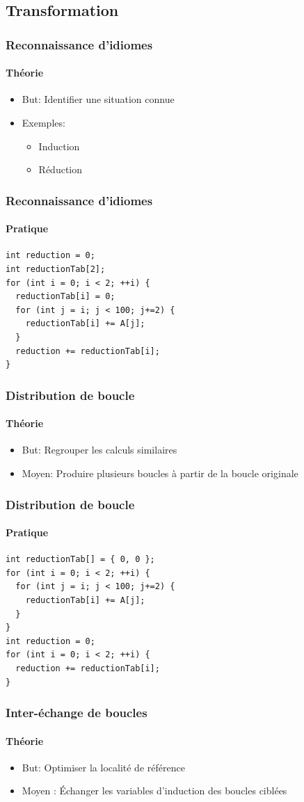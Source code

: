 \documentclass{beamer}
\begin{document}
\subsection{Transformation}
\begin{frame}
\frametitle{Reconnaissance d'idiomes}
\framesubtitle{Théorie}
\begin{itemize}
\item But: Identifier une situation connue
\item Exemples:
\begin{itemize}
\item Induction
\item Réduction
\end{itemize}
\end{itemize}
\end{frame}

\begin{frame}[fragile]
\frametitle{Reconnaissance d'idiomes}
\framesubtitle{Pratique}
\begin{lstlisting}
int reduction = 0;
int reductionTab[2];
for (int i = 0; i < 2; ++i) {
  reductionTab[i] = 0;
  for (int j = i; j < 100; j+=2) {
    reductionTab[i] += A[j];
  }
  reduction += reductionTab[i];
}
\end{lstlisting}
\end{frame}

\begin{frame}
\frametitle{Distribution de boucle}
\framesubtitle{Théorie}
\begin{itemize}
\item But: Regrouper les calculs similaires
\item Moyen: Produire plusieurs boucles à partir de la boucle originale
\end{itemize}
\end{frame}

\begin{frame}[fragile]
\frametitle{Distribution de boucle}
\framesubtitle{Pratique}
\begin{lstlisting}
int reductionTab[] = { 0, 0 };
for (int i = 0; i < 2; ++i) {
  for (int j = i; j < 100; j+=2) {
    reductionTab[i] += A[j];
  }
}
int reduction = 0;
for (int i = 0; i < 2; ++i) {
  reduction += reductionTab[i];
}
\end{lstlisting}
\end{frame}

\begin{frame}
\frametitle{Inter-échange de boucles}
\framesubtitle{Théorie}
\begin{itemize}
\item But: Optimiser la localité de référence
\item Moyen : Échanger les variables d'induction des boucles ciblées
\end{itemize}
\end{frame}
\end{document}
